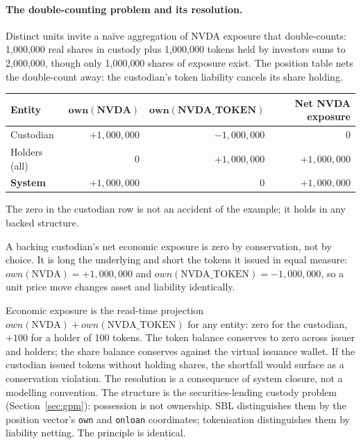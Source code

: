 \paragraph{The double-counting problem and its resolution.} Distinct units invite a na\"ive aggregation of NVDA exposure that double-counts: 1{,}000{,}000 real shares in custody plus 1{,}000{,}000 tokens held by investors sums to 2{,}000{,}000, though only 1{,}000{,}000 shares of exposure exist. The position table nets the double-count away: the custodian's token liability cancels its share holding.

\begin{center}\small
\begin{tabular}{@{}lrrr@{}}
\toprule
\textbf{Entity} & $\mathbf{own(NVDA)}$ & $\mathbf{own(NVDA\_TOKEN)}$ & \textbf{Net NVDA exposure} \\
\midrule
Custodian & $+1{,}000{,}000$ & $-1{,}000{,}000$ & $0$ \\
Holders (all) & $0$ & $+1{,}000{,}000$ & $+1{,}000{,}000$ \\
\midrule
\textbf{System} & $+1{,}000{,}000$ & $0$ & $+1{,}000{,}000$ \\
\bottomrule
\end{tabular}
\end{center}

The zero in the custodian row is not an accident of the example; it holds in any backed structure.

\begin{principle}
A backing custodian's net economic exposure is zero by conservation, not by choice. It is long the underlying and short the tokens it issued in equal measure: $own(\text{NVDA})=+1{,}000{,}000$ and $own(\text{NVDA\_TOKEN})=-1{,}000{,}000$, so a unit price move changes asset and liability identically.
\end{principle}

Economic exposure is the read-time projection $own(\text{NVDA})+own(\text{NVDA\_TOKEN})$ for any entity: zero for the custodian, $+100$ for a holder of 100 tokens. The token balance conserves to zero across issuer and holders; the share balance conserves against the virtual issuance wallet. If the custodian issued tokens without holding shares, the shortfall would surface as a conservation violation. The resolution is a consequence of system closure, not a modelling convention. The structure is the securities-lending custody problem (Section~\ref{sec:gpm}): possession is not ownership. SBL distinguishes them by the position vector's \texttt{own} and \texttt{onloan} coordinates; tokenisation distinguishes them by liability netting. The principle is identical.

